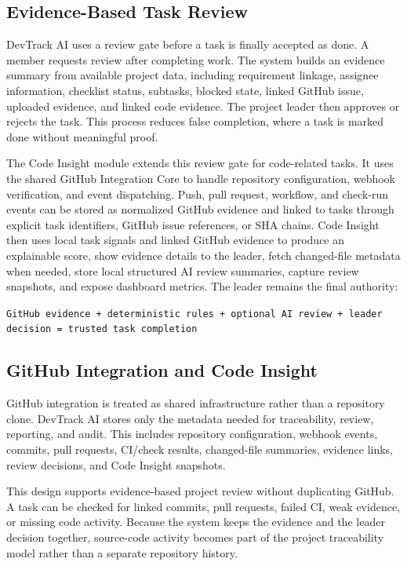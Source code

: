 \documentclass[runningheads]{llncs}
\begin{document}
\subsection{Evidence-Based Task Review}

DevTrack AI uses a review gate before a task is finally accepted as done. A member
requests review after completing work. The system builds an evidence summary from
available project data, including requirement linkage, assignee information,
checklist status, subtasks, blocked state, linked GitHub issue, uploaded evidence,
and linked code evidence. The project leader then approves or rejects the task. This
process reduces false completion, where a task is marked done without meaningful
proof.

The Code Insight module extends this review gate for code-related tasks. It uses the
shared GitHub Integration Core to handle repository configuration, webhook
verification, and event dispatching. Push, pull request, workflow, and check-run
events can be stored as normalized GitHub evidence and linked to tasks through
explicit task identifiers, GitHub issue references, or SHA chains. Code Insight then
uses local task signals and linked GitHub evidence to produce an explainable score,
show evidence details to the leader, fetch changed-file metadata when needed, store
local structured AI review summaries, capture review snapshots, and expose dashboard
metrics. The leader remains the final authority:

\begin{center}
\texttt{GitHub evidence + deterministic rules + optional AI review + leader decision = trusted task completion}
\end{center}

\subsection{GitHub Integration and Code Insight}

GitHub integration is treated as shared infrastructure rather than a repository
clone. DevTrack AI stores only the metadata needed for traceability, review,
reporting, and audit. This includes repository configuration, webhook events,
commits, pull requests, CI/check results, changed-file summaries, evidence links,
review decisions, and Code Insight snapshots.

This design supports evidence-based project review without duplicating GitHub. A
task can be checked for linked commits, pull requests, failed CI, weak evidence, or
missing code activity. Because the system keeps the evidence and the leader decision
together, source-code activity becomes part of the project traceability model rather
than a separate repository history.
\end{document}
